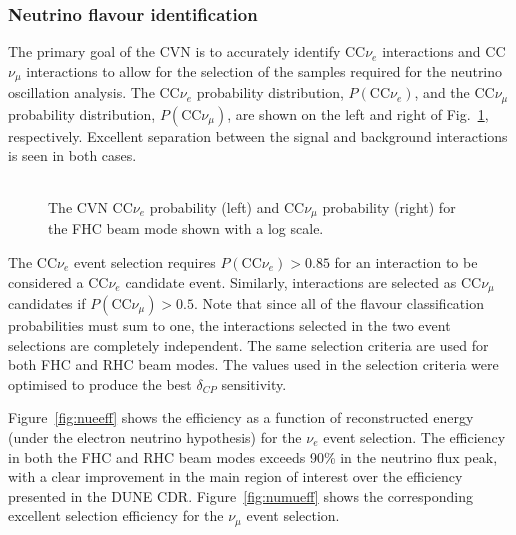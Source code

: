 \subsubsection{Neutrino flavour identification}
The primary goal of the CVN is to accurately identify CC$\nu_e$ interactions and CC$\nu_\mu$ interactions to allow for the selection of the samples required for the neutrino oscillation analysis. The CC$\nu_e$ probability distribution, $P(\textrm{CC}\nu_e)$, and the CC$\nu_\mu$ probability distribution, $P(\textrm{CC}\nu_\mu)$, are shown on the left and right of Fig.~\ref{fig:cvnprob}, respectively. Excellent separation between the signal and background interactions is seen in both cases.

\begin{figure}
    \centering
    \begin{tabular}{cc}
	\end{tabular}
	\caption{The CVN CC$\nu_e$ probability (left) and CC$\nu_\mu$ probability (right) for the FHC beam mode shown with a log scale.}
    \label{fig:cvnprob}
\end{figure}

The CC$\nu_e$ event selection requires $P(\textrm{CC}\nu_e) > 0.85$ for an interaction to be considered a CC$\nu_e$ candidate event. Similarly, interactions are selected as CC$\nu_\mu$ candidates if $P(\textrm{CC}\nu_\mu) > 0.5$. Note that since all of the flavour classification probabilities must sum to one, the interactions selected in the two event selections are completely independent. The same selection criteria are used for both FHC and RHC beam modes. The values used in the selection criteria were optimised to produce the best $\delta_{CP}$ sensitivity.

Figure~\ref{fig:nueeff} shows the efficiency as a function of reconstructed energy (under the electron neutrino hypothesis) for the $\nu_e$ event selection. The efficiency in both the FHC and RHC beam modes exceeds 90\% in the neutrino flux peak, with a clear improvement in the main region of interest over the efficiency presented in the DUNE CDR. Figure~\ref{fig:numueff} shows the corresponding excellent selection efficiency for the $\nu_\mu$ event selection.

